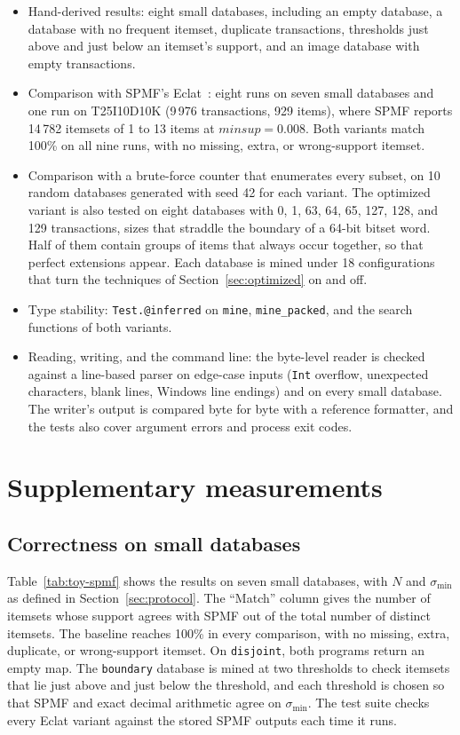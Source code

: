 \begin{itemize}
\item Hand-derived results: eight small databases, including an empty database, a
database with no frequent itemset, duplicate transactions, thresholds just above and
just below an itemset's support, and an image database with empty transactions.
\item Comparison with SPMF's Eclat~\cite{spmf2016}: eight runs on seven small databases
and one run on T25I10D10K (9\,976 transactions, 929 items), where SPMF reports 14\,782
itemsets of 1 to 13 items at $\mathit{minsup} = 0.008$. Both variants match 100\% on all
nine runs, with no missing, extra, or wrong-support itemset.
\item Comparison with a brute-force counter that enumerates every subset, on 10 random
databases generated with seed 42 for each variant. The optimized variant is also tested
on eight databases with 0, 1, 63, 64, 65, 127, 128, and 129 transactions, sizes that
straddle the boundary of a 64-bit bitset word. Half of them contain groups of items that
always occur together, so that perfect extensions appear. Each database is mined under 18
configurations that turn the techniques of Section~\ref{sec:optimized} on and off.
\item Type stability: \texttt{Test.@inferred} on \texttt{mine}, \texttt{mine\_packed},
and the search functions of both variants.
\item Reading, writing, and the command line: the byte-level reader is checked against a
line-based parser on edge-case inputs (\texttt{Int} overflow, unexpected characters,
blank lines, Windows line endings) and on every small database. The writer's output is
compared byte for byte with a reference formatter, and the tests also cover argument
errors and process exit codes.
\end{itemize}

\section{Supplementary measurements}
\label{app:measurements}

\subsection{Correctness on small databases}
\label{app:toy}
Table~\ref{tab:toy-spmf} shows the results on seven small databases, with $N$ and
$\sigma_{\min}$ as defined in Section~\ref{sec:protocol}. The ``Match'' column gives the
number of itemsets whose support agrees with SPMF out of the total number of distinct
itemsets. The baseline reaches 100\% in every comparison, with no missing, extra,
duplicate, or wrong-support itemset. On \texttt{disjoint}, both programs return an empty
map. The \texttt{boundary} database is mined at two thresholds to check itemsets that lie
just above and just below the threshold, and each threshold is chosen so that SPMF and
exact decimal arithmetic agree on $\sigma_{\min}$. The test suite checks every Eclat
variant against the stored SPMF outputs each time it runs.


